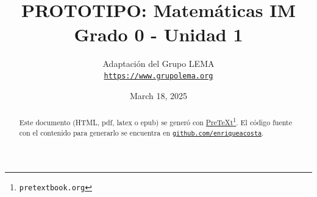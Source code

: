 
\title{PROTOTIPO: Matemáticas IM\textsuperscript{\textregistered}\\
{\large Grado 0 - Unidad 1}}
\author{Adaptación del Grupo LEMA\\
\href{https://www.grupolema.org}{\nolinkurl{https://www.grupolema.org}}
}
\date{March 18, 2025}

\raggedbottom
\label{gra0-uni1}\hypertarget{gra0-uni1}{}
\maketitle
\thispagestyle{empty}
\renewcommand*{\abstractname}{}
\begin{abstract}
Este documento (HTML, pdf, latex o epub) se generó con \href{https://pretextbook.org}{PreTeXt}\footnote{\nolinkurl{pretextbook.org}\label{meta-source-2-2}}. El código fuente con el contenido para generarlo se encuentra en \href{https://github.com/enriqueacosta/IllustrativeMath-GrupoLEMA}{\nolinkurl{github.com/enriqueacosta}}.%
\end{abstract}
\clearpage
\renewcommand*{\abstractname}{Resumen}
